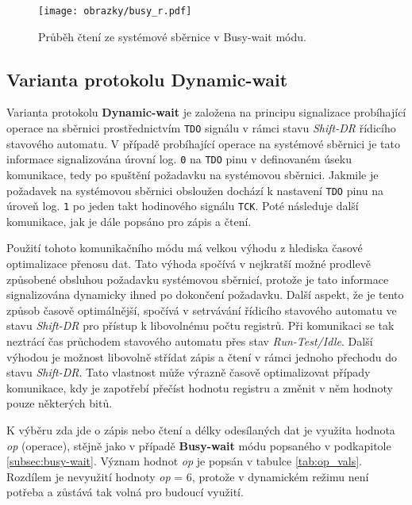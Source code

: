 \begin{figure}[H]
  \begin{center}
    \texttt{[image: obrazky/busy\_r.pdf]}
  \end{center}
  \caption{Průběh čtení ze systémové sběrnice v Busy-wait módu.}
	\label{fig:busy_r}
\end{figure}

\subsection{Varianta protokolu Dynamic-wait}	\label{subsec:dyn-wait}
Varianta protokolu \textbf{Dynamic-wait} je založena na principu signalizace probíhající operace na sběrnici prostřednictvím \texttt{\acs{TDO}} signálu v rámci stavu \textit{Shift-DR} řídicího stavového automatu. V případě probíhající operace na systémové sběrnici je tato informace signalizována úrovní log. \texttt{0} na \texttt{\acs{TDO}} pinu v definovaném úseku komunikace, tedy po spuštění požadavku na systémovou sběrnici. Jakmile je požadavek na systémovou sběrnici obsloužen dochází k nastavení \texttt{\acs{TDO}} pinu na úroveň log. \texttt{1} po jeden takt hodinového signálu \texttt{\acs{TCK}}. Poté následuje další komunikace, jak je dále popsáno pro zápis a čtení.

Použití tohoto komunikačního módu má velkou výhodu z hlediska časové optimalizace přenosu dat. Tato výhoda spočívá v nejkratší možné prodlevě způsobené obsluhou požadavku systémovou sběrnicí, protože je tato informace signalizována dynamicky ihned po dokončení požadavku. Další aspekt, že je tento způsob časově optimálnější, spočívá v setrvávání řídicího stavového automatu ve stavu \textit{Shift-DR} pro přístup k libovolnému počtu registrů. Při komunikaci se tak neztrácí čas průchodem stavového automatu přes stav \textit{Run-Test/Idle}. Další výhodou je možnost libovolně střídat zápis a čtení v rámci jednoho přechodu do stavu \textit{Shift-DR}. Tato vlastnost může výrazně časově optimalizovat případy komunikace, kdy je zapotřebí přečíst hodnotu registru a změnit v něm hodnoty pouze některých bitů.

K výběru zda jde o zápis nebo čtení a délky odesílaných dat je využita hodnota \textit{op} (operace), stějně jako v případě \textbf{Busy-wait} módu popsaného v podkapitole \ref{subsec:busy-wait}. Význam hodnot \textit{op} je popsán v tabulce \ref{tab:op_vals}. Rozdílem je nevyužití hodnoty \textit{op} = 6, protože v dynamickém režimu není potřeba a zůstává tak volná pro budoucí využití.

